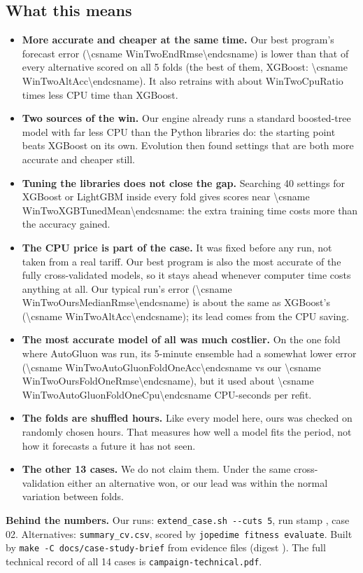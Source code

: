 \documentclass[11pt]{article}
\newcommand{\W}[2]{\csname Win#1#2\endcsname}   %
\begin{document}
\subsection{What this means}
\begin{itemize}
\item \textbf{More accurate and cheaper at the same time.} Our best program's forecast error (\num{\W{Two}{EndRmse}}) is lower than that of every
alternative scored on all 5 folds (the best of them, XGBoost: \num{\W{Two}{AltAcc}}). It also retrains with about \W{Two}{CpuRatio} times less CPU time than XGBoost.
\item \textbf{Two sources of the win.} Our engine already runs a standard boosted-tree model with far less CPU than the Python libraries do:
the starting point beats XGBoost on its own. Evolution then found settings that are both more accurate and cheaper still.
\item \textbf{Tuning the libraries does not close the gap.} Searching 40 settings for XGBoost or LightGBM inside every fold gives scores near
\num{\W{Two}{XGBTunedMean}}: the extra training time costs more than the accuracy gained.
\end{itemize}

\begin{carebox}
\begin{itemize}
\item \textbf{The CPU price is part of the case.} It was fixed before any run, not taken from a real tariff. Our best program is also the most
accurate of the fully cross-validated models, so it stays ahead whenever computer time costs anything at all. Our typical run's error
(\num{\W{Two}{OursMedianRmse}}) is about the same as XGBoost's (\num{\W{Two}{AltAcc}}); its lead comes from the CPU saving.
\item \textbf{The most accurate model of all was much costlier.} On the one fold where AutoGluon was run, its 5-minute ensemble had a
somewhat lower error (\num{\W{Two}{AutoGluonFoldOneAcc}} vs our \num{\W{Two}{OursFoldOneRmse}}), but it used about
\num[round-precision=2]{\W{Two}{AutoGluonFoldOneCpu}} CPU-seconds per refit.
\item \textbf{The folds are shuffled hours.} Like every model here, ours was checked on randomly chosen hours. That measures how well
a model fits the period, not how it forecasts a future it has not seen.
\item \textbf{The other 13 cases.} We do not claim them. Under the same cross-validation either an alternative won, or our lead was within the
normal variation between folds.
\end{itemize}
\end{carebox}

\vfill
{\scriptsize\color{alt}\sloppy\textbf{Behind the numbers.} Our runs: \texttt{extend\_case.sh -{}-cuts 5}, run stamp \texttt{\BriefCvStamp}, case 02.
Alternatives: \texttt{summary\_cv.csv}, scored by \texttt{jopedime fitness evaluate}.
Built by \texttt{make -C docs/case-study-brief} from \BriefInputCount{} evidence files (digest \texttt{\BriefInputsSha}). The full technical
record of all 14 cases is \texttt{campaign-technical.pdf}.}
\end{document}
